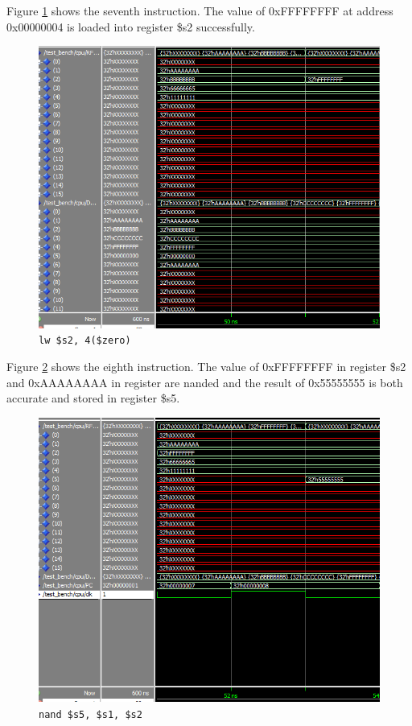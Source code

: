 \documentclass[12pt]{article}
\begin{document}
Figure \ref{fig:7-instr} shows the seventh instruction. The value of 0xFFFFFFFF at address 0x00000004 is loaded into register \$s2 successfully.
\begin{figure}[h!]
\centering
\includegraphics[width=\linewidth]{simulation/7-instr}
\caption{\texttt{lw \$s2, 4(\$zero)}}
\label{fig:7-instr}
\end{figure}
\clearpage
Figure \ref{fig:8-instr} shows the eighth instruction. The value of 0xFFFFFFFF in register \$s2 and 0xAAAAAAAA in register are nanded and the result of 0x55555555 is both accurate and stored in register \$s5.
\begin{figure}[h!]
\centering
\includegraphics[width=\linewidth]{simulation/8-instr}
\caption{\texttt{nand \$s5, \$s1, \$s2}}
\label{fig:8-instr}
\end{figure}
\clearpage
\end{document}
